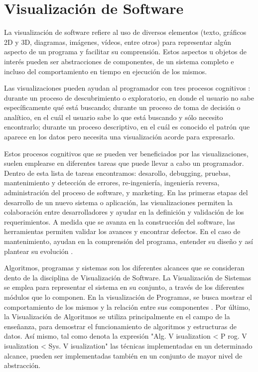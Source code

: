 \section{Visualización de Software}

La visualización de software refiere al uso de diversos elementos (texto, 
gráficos 2D y 3D, diagramas, imágenes, vídeos, entre otros) para representar algún
aspecto de un programa y facilitar su comprensión.\cite{PetreDeQuency06}\cite{[GH01]Che06]}
Estos aspectos u objetos de interés pueden ser abstracciones de componentes, de
un sistema completo e incluso del comportamiento en tiempo en ejecución de los
mismos. \cite{TeysereCampo09}

Las visualizaciones pueden ayudan al programador con tres procesos cognitivos
\cite{ButlerAlmond93}:
durante un proceso de descubrimiento o exploratorio, en donde el usuario no
sabe específicamente qué está buscando;
durante un proceso de toma de decisión o analítico, en el cuál el usuario sabe lo que
está buscando y sólo necesito encontrarlo;
durante un proceso descriptivo, en el cuál es conocido el patrón que aparece en los
datos pero necesita una visualización acorde para expresarlo.

Estos procesos cognitivos que se pueden ver beneficiados por las visualizaciones, suelen
emplearse en diferentes tareas que puede llevar a cabo un programador.
Dentro de esta lista de tareas \cite{MalleticMarcusCollard02} encontramos: desarollo,
debugging, pruebas, mantenimiento y detección de errores, re-ingeniería, ingeniería reversa,
administración del proceso de software, y marketing.
En las primeras etapas del desarrollo de un nuevo sistema o aplicación, las visualizaciones
permiten la colaboración entre desarrolladores y ayudar en la definición y validación de los
requerimientos.
A medida que se avanza en la construcción del software, las herramientas permiten validar
los avances y encontrar defectos.
En el caso de mantenimiento, ayudan en la comprensión del programa, entender su diseño y
así plantear su evolución \cite{PetreDeQuency06}.

Algoritmos, programas y sistemas son los diferentes alcances que se consideran
dento de la disciplina de Visualización de Software.\cite{[PBS93][Mye90]}
La Visualización de Sistemas se emplea para representar el sistema en su conjunto,
a través de los diferentes módulos que lo componen.
En la visualización de Programas, se busca mostrar el comportamiento de los mismos
y la relación entre sus componentes \cite{BA01}.
Por último, la Visualización de Algoritmos se utiliza principalmente en el campo de la enseñanza,
para demostrar el funcionamiento de algoritmos y estructuras de datos.
Así mismo, tal como denota la expresión 
"Alg. V isualization < P rog. V isualization < Sys. V isualization"\cite{PIROBV-YDS-2007}
las técnicas implementadas en un determinado alcance, pueden ser implementadas
también en un conjunto de mayor nivel de abstracción.

